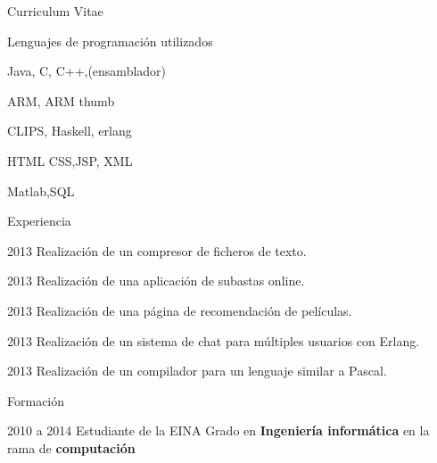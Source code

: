 \begin{cv}{Curriculum Vitae}


\begin{cvlist}{Lenguajes de programación utilizados}
\item Java, C, C++,(ensamblador)
\item ARM, ARM thumb
\item CLIPS, Haskell, erlang
\item HTML CSS,JSP, XML
\item Matlab,SQL
\end{cvlist}

\begin{cvlist}{Experiencia}

	\item[2013] Realización de un compresor de ficheros de texto.
	\item[2013] Realización de una aplicación de subastas online.
	\item[2013] Realización de una página de recomendación de películas.
	\item[2013] Realización de un sistema de chat para múltiples usuarios con Erlang.
	\item[2013] Realización de un compilador para un lenguaje similar a Pascal.
	

\end{cvlist}

\begin{cvlist}{Formación}
	\item[2010 a 2014] Estudiante de la EINA
		Grado en \textbf{Ingeniería informática} en la rama de \textbf{computación}
\end{cvlist}

\end{cv}